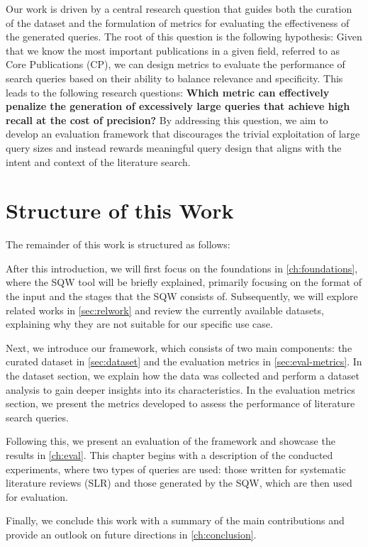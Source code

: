 Our work is driven by a central research question that guides both the curation of the dataset and the formulation of metrics for evaluating the effectiveness of the generated queries. The root of this question is the following hypothesis: Given that we know the most important publications in a given field, referred to as Core Publications (CP), we can design metrics to evaluate the performance of search queries based on their ability to balance relevance and specificity. This leads to the following research questions: \textbf{Which metric can effectively penalize the generation of excessively large queries that achieve high recall at the cost of precision?} By addressing this question, we aim to develop an evaluation framework that discourages the trivial exploitation of large query sizes and instead rewards meaningful query design that aligns with the intent and context of the literature search.


\section{Structure of this Work}\label{sec:structure}
The remainder of this work is structured as follows:

After this introduction, we will first focus on the foundations in \autoref{ch:foundations}, where the SQW tool will be briefly explained, primarily focusing on the format of the input and the stages that the SQW consists of. Subsequently, we will explore related works in \autoref{sec:relwork} and review the currently available datasets, explaining why they are not suitable for our specific use case.

Next, we introduce our framework, which consists of two main components: the curated dataset in \autoref{sec:dataset} and the evaluation metrics in \autoref{sec:eval-metrics}. In the dataset section, we explain how the data was collected and perform a dataset analysis to gain deeper insights into its characteristics. In the evaluation metrics section, we present the metrics developed to assess the performance of literature search queries.

Following this, we present an evaluation of the framework and showcase the results in \autoref{ch:eval}. This chapter begins with a description of the conducted experiments, where two types of queries are used: those written for systematic literature reviews (SLR) and those generated by the SQW, which are then used for evaluation.

Finally, we conclude this work with a summary of the main contributions and provide an outlook on future directions in \autoref{ch:conclusion}.


